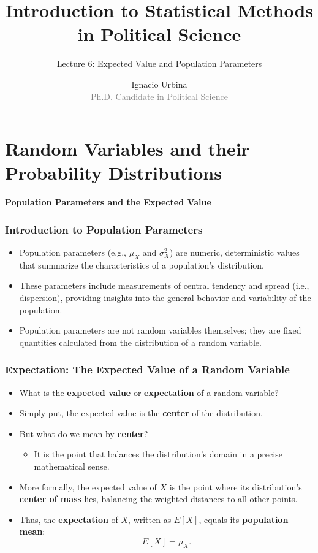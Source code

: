 \documentclass[handout]{beamer} %
\title{Introduction to Statistical Methods in Political Science}
\subtitle{Lecture 6: Expected Value and Population Parameters}
\author{Ignacio Urbina \texorpdfstring{\\ \vspace{0.3em}}{ } \scriptsize \textcolor{gray}{Ph.D. Candidate in Political Science}}
\date{}
\newcommand{\transitionslide}[1]{
    \begin{frame} %
        \centering
        \vspace{1cm}
        \Huge
        \textcolor{moonstoneblue!150}{\textbf{#1}}
    \end{frame}
}
\begin{document}
\frame{\titlepage}

\section{Random Variables and their Probability Distributions}

\transitionslide{Population Parameters and the Expected Value}

\begin{frame} %
\frametitle{Introduction to Population Parameters}

\begin{itemize}
  \item Population parameters (e.g., $\mu_X$ and $\sigma_X^2$) are numeric, deterministic values that summarize the characteristics of a population's distribution.
  \pause
  \item These parameters include measurements of central tendency and spread (i.e., dispersion), providing insights into the general behavior and variability of the population.
  \pause
  \item Population parameters are not random variables themselves; they are fixed quantities calculated from the distribution of a random variable.
\end{itemize}

\end{frame}

\begin{frame} %
\frametitle{Expectation: The Expected Value of a Random Variable}

\begin{itemize}
  \item What is the \textbf{expected value} or \textbf{expectation} of a random variable?
  \pause
  \item Simply put, the expected value is the \textbf{center} of the distribution.
  \pause
  \item But what do we mean by \textbf{center}?
  \pause
  \begin{itemize}
    \item It is the point that balances the distribution’s domain in a precise mathematical sense.
  \end{itemize}
  \pause
  \item More formally, the expected value of $X$ is the point where its distribution’s \textbf{center of mass} lies, balancing the weighted distances to all other points.
  \pause
  \item Thus, the \textbf{expectation} of $X$, written as $E[X]$, equals its \textbf{population mean}:
    \[
    E[X] = \mu_X.
    \]
\end{itemize}

\end{frame}
\end{document}
